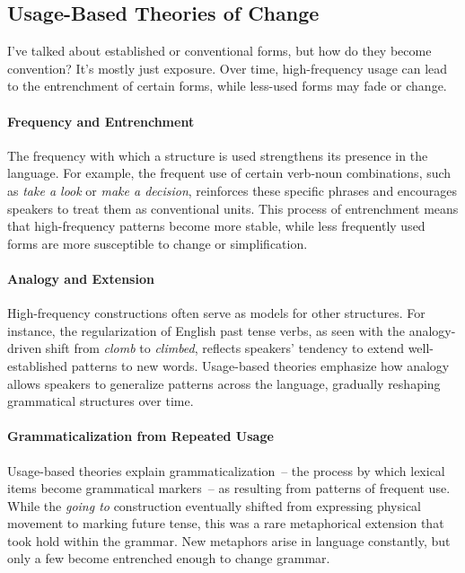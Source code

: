 \subsection{Usage-Based Theories of Change}

I've talked about established or conventional forms, but how do they become convention? It's mostly just exposure. Over time, high-frequency usage can lead to the entrenchment of certain forms, while less-used forms may fade or change.

\paragraph*{Frequency and Entrenchment}

The frequency with which a structure is used strengthens its presence in the language. For example, the frequent use of certain verb-noun combinations, such as \textit{take a look} or \textit{make a decision}, reinforces these specific phrases and encourages speakers to treat them as conventional units. This process of entrenchment means that high-frequency patterns become more stable, while less frequently used forms are more susceptible to change or simplification.

\paragraph*{Analogy and Extension}

High-frequency constructions often serve as models for other structures. For instance, the regularization of English past tense verbs, as seen with the analogy-driven shift from \textit{clomb} to \textit{climbed}, reflects speakers' tendency to extend well-established patterns to new words. Usage-based theories emphasize how analogy allows speakers to generalize patterns across the language, gradually reshaping grammatical structures over time.

\paragraph*{Grammaticalization from Repeated Usage}

Usage-based theories explain grammaticalization~-- the process by which lexical items become grammatical markers~-- as resulting from patterns of frequent use. While the \textit{going to} construction eventually shifted from expressing physical movement to marking future tense, this was a rare metaphorical extension that took hold within the grammar. New metaphors arise in language constantly, but only a few become entrenched enough to change grammar. 

